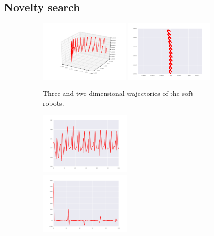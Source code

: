 \documentclass{sig-alternate}
\begin{document}
\subsection{Novelty search}

\begin{figure}[t!]
\centering
\begin{subfigure}[b]{0.47\textwidth}
\centering
\includegraphics[width=0.49\textwidth]{../Figures/Behaviors/3d.pdf}
\includegraphics[width=0.49\textwidth]{../Figures/Behaviors/2d.pdf}
\caption{Three and two dimensional trajectories of the soft robots.}
\end{subfigure}
\begin{subfigure}[t]{0.23\textwidth}
\centering
\includegraphics[width=0.5\textwidth]{../Figures/Behaviors/pace.pdf}~
\includegraphics[width=0.5\textwidth]{../Figures/Behaviors/pacedft.pdf}

\end{subfigure}
\end{figure}
\end{document}
